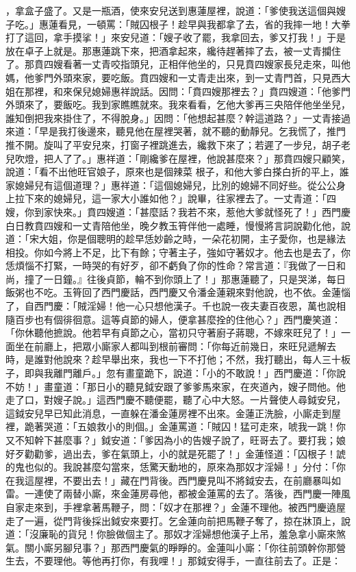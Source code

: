 ，拿盒子盛了。又是一瓶酒，使來安兒送到惠蓮屋裡，說道：「爹使我送這個與嫂子吃。」惠蓮看見，一頓罵：「賊囚根子！趁早與我都拿了去，省的我摔一地！大拳打了這回，拿手摸挲！」來安兒道：「嫂子收了罷，我拿回去，爹又打我！」于是放在卓子上就是。那惠蓮跳下來，把酒拿起來，纔待趕著摔了去，被一丈青攔住了。那賁四嫂看著一丈青咬指頭兒，正相伴他坐的，只見賁四嫂家長兒走來，叫他媽，他爹門外頭來家，要吃飯。賁四嫂和一丈青走出來，到一丈青門首，只見西大姐在那裡，和來保兒媳婦惠祥說話。因問：「賁四嫂那裡去？」賁四嫂道：「他爹門外頭來了，要飯吃。我到家瞧瞧就來。我來看看，乞他大爹再三央陪伴他坐坐兒，誰知倒把我來掛住了，不得脫身。」因問：「他想起甚麼？幹這道路？」一丈青接過來道：「早是我打後邊來，聽見他在屋裡哭著，就不聽的動靜兒。乞我慌了，推門推不開。旋叫了平安兒來，打窗子裡跳進去，纔救下來了；若遲了一步兒，胡子老兒吹燈，把人了了。」惠祥道：「剛纔爹在屋裡，他說甚麼來？」那賁四嫂只顧笑，說道：「看不出他旺官娘子，原來也是個辣菜 根子，和他大爹白搽白折的平上，誰家媳婦兒有這個道理？」惠祥道：「這個媳婦兒，比別的媳婦不同好些。從公公身上拉下來的媳婦兒，這一家大小誰如他？」說畢，往家裡去了。一丈青道：「四嫂，你到家快來。」賁四嫂道：「甚麼話？我若不來，惹他大爹就怪死了！」西門慶白日教賁四嫂和一丈青陪他坐，晚夕教玉筲伴他一處睡，慢慢將言詞說勸化他，說道：「宋大姐，你是個聰明的趁早恁妙齡之時，一朵花初開，主子愛你，也是緣法相投。你如今將上不足，比下有餘；守著主子，強如守著奴才。他去也是去了，你恁煩惱不打緊，一時哭的有好歹，卻不虧負了你的性命？常言道：『我做了一日和尚，撞了一日鐘。』往後貞節，輪不到你頭上了！」那惠蓮聽了，只是哭涕，每日飯粥也不吃。玉筲回了西門慶話，西門慶又令潘金蓮親來對他說，也不依。金蓮惱了，自西門慶：「賊淫婦！他一心只想他漢子。千也說一夜夫妻百夜恩，萬也說相隨百步也有個徘徊意。這等貞節的婦人，便拿甚麼拴的住他心？」西門慶笑道：「你休聽他摭說。他若早有貞節之心，當初只守著廚子蔣聰，不嫁來旺兒了！」一面坐在前廳上，把眾小廝家人都叫到根前審問：「你每近前幾日，來旺兒遞解去時，是誰對他說來？趁早舉出來，我也一下不打他；不然，我打聽出，每人三十板子，即與我離門離戶。」忽有畫童跪下，說道：「小的不敢說！」西門慶道：「你說不妨！」畫童道：「那日小的聽見鉞安跟了爹爹馬來家，在夾道內，嫂子問他。他走了口，對嫂子說。」這西門慶不聽便罷，聽了心中大怒。一片聲使人尋鉞安兒，這鉞安兒早已知此消息，一直躲在潘金蓮房裡不出來。金蓮正洗臉，小廝走到屋裡，跪著哭道：「五娘救小的則個。」金蓮罵道：「賊囚！猛可走來，唬我一跳！你又不知幹下甚麼事？」鉞安道：「爹因為小的告嫂子說了，旺哥去了。要打我；娘好歹勸勸爹，過出去，爹在氣頭上，小的就是死罷了！」金蓮怪道：「囚根子！諕的鬼也似的。我說甚麼勾當來，恁驚天動地的，原來為那奴才淫婦！」分付：「你在我這屋裡，不要出去！」藏在門背後。西門慶見叫不將鉞安去，在前廳暴叫如雷。一連使了兩替小廝，來金蓮房尋他，都被金蓮罵的去了。落後，西門慶一陣風自家走來到，手裡拿著馬鞭子，問：「奴才在那裡？」金蓮不理他。被西門慶遶屋走了一遍，從門背後採出鉞安來要打。乞金蓮向前把馬鞭子奪了，掠在牀頂上，說道：「沒廉恥的貨兒！你臉做個主了。那奴才淫婦想他漢子上吊，羞急拿小廝來煞氣。關小廝另腳兒事？」那西門慶氣的睜睜的。金蓮叫小廝：「你往前頭幹你那營生去，不要理他。等他再打你，有我哩！」那鉞安得手，一直往前去了。正是：


